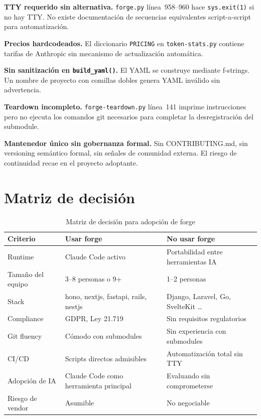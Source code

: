 \documentclass[12pt,a4paper]{article}
\begin{document}
\textbf{TTY requerido sin alternativa.} \texttt{forge.py} l\'inea~958--960 hace \texttt{sys.exit(1)} si no hay TTY. No existe documentaci\'on de secuencias equivalentes script-a-script para automatizaci\'on.

\textbf{Precios hardcodeados.} El diccionario \texttt{PRICING} en \texttt{token-stats.py} contiene tarifas de Anthropic sin mecanismo de actualizaci\'on autom\'atica.

\textbf{Sin sanitizaci\'on en \texttt{build\_yaml()}.} El YAML se construye mediante f-strings. Un nombre de proyecto con comillas dobles genera YAML inv\'alido sin advertencia.

\textbf{Teardown incompleto.} \texttt{forge-teardown.py} l\'inea~141 imprime instrucciones pero no ejecuta los comandos git necesarios para completar la desregistraci\'on del submodule.

\textbf{Mantenedor \'unico sin gobernanza formal.} Sin CONTRIBUTING.md, sin versioning sem\'antico formal, sin se\~nales de comunidad externa. El riesgo de continuidad recae en el proyecto adoptante.

\section{Matriz de decisión}

\begin{table}[h!]
  \centering
  \small
  \begin{tabular}{@{}lll@{}}
    \toprule
    \textbf{Criterio} & \textbf{Usar forge} & \textbf{No usar forge} \\
    \midrule
    Runtime & Claude Code activo & Portabilidad entre herramientas IA \\
    Tama\~no del equipo & 3--8 personas o 9+ & 1--2 personas \\
    Stack & hono, nextjs, fastapi, rails, nestjs & Django, Laravel, Go, SvelteKit \ldots \\
    Compliance & GDPR, Ley 21.719 & Sin requisitos regulatorios \\
    Git fluency & C\'omodo con submodules & Sin experiencia con submodules \\
    CI/CD & Scripts directos admisibles & Automatizaci\'on total sin TTY \\
    Adopci\'on de IA & Claude Code como herramienta principal & Evaluando sin comprometerse \\
    Riesgo de vendor & Asumible & No negociable \\
    \bottomrule
  \end{tabular}
  \caption{Matriz de decisi\'on para adopci\'on de forge}
\end{table}
\end{document}
